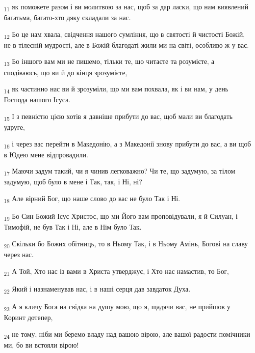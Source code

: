 \begin{tcolorbox}
\textsubscript{11} як поможете разом і ви молитвою за нас, щоб за дар ласки, що нам виявлений багатьма, багато-хто дяку складали за нас.
\end{tcolorbox}
\begin{tcolorbox}
\textsubscript{12} Бо це нам хвала, свідчення нашого сумління, що в святості й чистості Божій, не в тілесній мудрості, але в Божій благодаті жили ми на світі, особливо ж у вас.
\end{tcolorbox}
\begin{tcolorbox}
\textsubscript{13} Бо іншого вам ми не пишемо, тільки те, що читаєте та розумієте, а сподіваюсь, що ви й до кінця зрозумієте,
\end{tcolorbox}
\begin{tcolorbox}
\textsubscript{14} як частинно нас ви й зрозуміли, що ми вам похвала, як і ви нам, у день Господа нашого Ісуса.
\end{tcolorbox}
\begin{tcolorbox}
\textsubscript{15} І з певністю цією хотів я давніше прибути до вас, щоб мали ви благодать удруге,
\end{tcolorbox}
\begin{tcolorbox}
\textsubscript{16} і через вас перейти в Македонію, а з Македонії знову прибути до вас, а ви щоб в Юдею мене відпровадили.
\end{tcolorbox}
\begin{tcolorbox}
\textsubscript{17} Маючи задум такий, чи я чинив легковажно? Чи те, що задумую, за тілом задумую, щоб було в мене і Так, так, і Ні, ні?
\end{tcolorbox}
\begin{tcolorbox}
\textsubscript{18} Але вірний Бог, що наше слово до вас не було Так і Ні.
\end{tcolorbox}
\begin{tcolorbox}
\textsubscript{19} Бо Син Божий Ісус Христос, що ми Його вам проповідували, я й Силуан, і Тимофій, не був Так і Ні, але в Нім було Так.
\end{tcolorbox}
\begin{tcolorbox}
\textsubscript{20} Скільки бо Божих обітниць, то в Ньому Так, і в Ньому Амінь, Богові на славу через нас.
\end{tcolorbox}
\begin{tcolorbox}
\textsubscript{21} А Той, Хто нас із вами в Христа утверджує, і Хто нас намастив, то Бог,
\end{tcolorbox}
\begin{tcolorbox}
\textsubscript{22} Який і назнаменував нас, і в наші серця дав завдаток Духа.
\end{tcolorbox}
\begin{tcolorbox}
\textsubscript{23} А я кличу Бога на свідка на душу мою, що я, щадячи вас, не прийшов у Коринт дотепер,
\end{tcolorbox}
\begin{tcolorbox}
\textsubscript{24} не тому, ніби ми беремо владу над вашою вірою, але вашої радости помічники ми, бо ви встояли вірою!
\end{tcolorbox}

